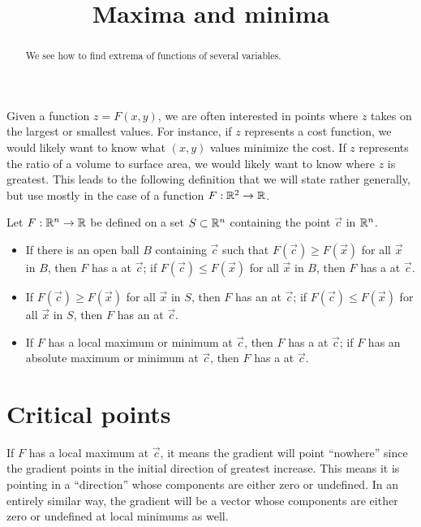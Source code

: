 \documentclass{ximera}
\title[Dig-In:]{Maxima and minima}
\begin{document}
\begin{abstract}
  We see how to find extrema of functions of several variables.
\end{abstract}
\maketitle


Given a function $z=F(x,y)$, we are often interested in points where
$z$ takes on the largest or smallest values. For instance, if $z$
represents a cost function, we would likely want to know what $(x,y)$
values minimize the cost. If $z$ represents the ratio of a volume to
surface area, we would likely want to know where $z$ is greatest. This
leads to the following definition that we will state rather generally,
but use mostly in the case of a function $F:\mathbb R^2\to\mathbb R$.

\begin{definition}
Let $F:\mathbb R^n\to\mathbb R$ be defined on a set $S\subset\mathbb R^n$ containing the
point $\vec{c}$ in $\mathbb R^n$.
\begin{itemize}
\item If there is an open ball $B$ containing $\vec{c}$ such that
  $F(\vec{c}) \geq F(\vec{x})$ for all $\vec{x}$ in $B$, then $F$ has a
   at $\vec{c}$; if $F(\vec{c}) \leq F(\vec{x})$ for all
  $\vec{x}$ in $B$, then $F$ has a  at $\vec{c}$.
\item If $F(\vec{c})\geq F(\vec{x})$ for all $\vec{x}$ in $S$, then $F$ has
  an  at $\vec{c}$; if $F(\vec{c})\leq F(\vec{x})$ for
  all $\vec{x}$ in $S$, then $F$ has an  at
  $\vec{c}$.
\item If $F$ has a local maximum or minimum at $\vec{c}$, then $F$ has a
   at $\vec{c}$; if $F$ has an absolute maximum or
  minimum at $\vec{c}$, then $F$ has a  at $\vec{c}$.
\end{itemize}
\end{definition}


\section{Critical points}



If $F$ has a local maximum at $\vec{c}$, it means the
gradient will point ``nowhere'' since the gradient points in the
initial direction of greatest increase. This means it is pointing in a
``direction'' whose components are either zero or undefined. In an
entirely similar way, the gradient will be a vector whose components
are either zero or undefined at local minimums as well. 
\end{document}
